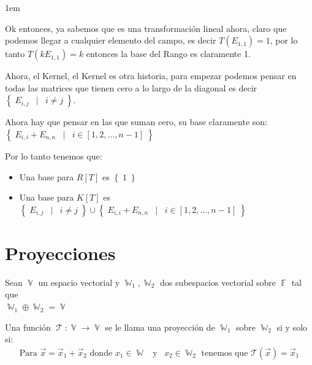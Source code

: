 \documentclass[12pt, fleqn]{report}                             %
\newenvironment{SmallIndentation}[1][0.75em]                    %
        {\begin{adjustwidth}{#1}{}\begin{footnotesize}}             %
        {\end{footnotesize}\end{adjustwidth}}                       %
\DeclareMathOperator \Space     {\quad}                         %
\DeclareMathOperator \MiniSpace {\;}                            %
\newcommand \Such           {\MiniSpace | \MiniSpace}           %
\newcommand \Also           {\MiniSpace \text{y} \MiniSpace}    %
\theoremstyle{break}                                            %
\DeclareMathOperator \GenericField {\mathbb{F}}                 %
\DeclareMathOperator \VectorSet    {\mathbb{V}}                 %
\DeclareMathOperator \SubVectorSet {\mathbb{W}}                 %
\DeclareMathOperator \LinTrans      {\mathcal{T}}               %
\newcommand{\Set}[1]            {\left\{ \; #1 \; \right\}}     %
\newcommand{\Wrap}[1]           {\left( #1 \right)}             %
\newcommand{\FnLinTrans}[1]{\mathcal{T}\Wrap{#1}}               %
\begin{document}
\begin{itemize}
\begin{SmallIndentation}[1em]
                            Ok entonces, ya sabemos que es una transformación lineal
                            ahora, claro que podemos llegar a cualquier elemento del campo,
                            es decir $T(E_{1, 1}) = 1$, por lo tanto $T(kE_{1, 1}) = k$
                            entonces la base del Rango es claramente {1}.

                            Ahora, el Kernel, el Kernel es otra historia, para empezar podemos
                            pensar en todas las matrices que tienen cero a lo largo de la diagonal
                            es decir $\Set{E_{i, j} \Such i \neq j}$.

                            Ahora hay que pensar en las que suman cero, su base claramente son:
                            $\Set{E_{i, i} + E_{n, n} \Such i \in [1, 2, \dots, n - 1]}$

                            Por lo tanto tenemos que:
                            \begin{itemize}
                                \item Una base para $R[T]$ es $\Set{1}$
                                \item Una base para $K[T]$ es $\Set{E_{i, j} \Such i \neq j} \cup 
                                    \Set{E_{i, i} + E_{n, n} \Such i \in [1, 2, \dots, n - 1]}$
                            \end{itemize}
                        
                        \end{SmallIndentation}


                \end{itemize}

                        


        \clearpage
        \section{Proyecciones}

            
            Sean $\VectorSet$ un espacio vectorial y $\SubVectorSet_1, \SubVectorSet_2$ dos subespacios 
            vectorial sobre $\GenericField$ tal que \\
            $\SubVectorSet_1 \oplus \SubVectorSet_2 = \VectorSet$ 

            Una función $\LinTrans: \VectorSet \to \VectorSet$ se le llama una proyección
            de $\SubVectorSet_1$ sobre $\SubVectorSet_2$ si y solo si:
            \begin{align*}
                \text{Para } 
                    \vec x = \vec x_1 + \vec x_2 \text{ donde } 
                    x_1 \in \SubVectorSet \Also
                    x_2 \in \SubVectorSet_2
                    \text{ tenemos que }
                    \FnLinTrans{\vec x} = \vec x_1
            \end{align*}
\end{document}

